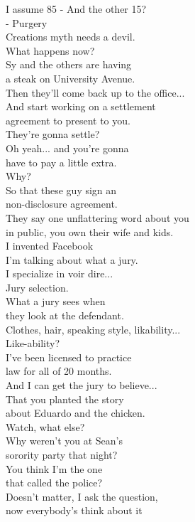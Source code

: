 \documentclass{article}
\begin{document}
\begin{multicols}{3}
I assume 85%
- And the other 15?\\
- Purgery\\
Creations myth needs a devil.\\
What happens now?\\
Sy and the others are having\\
a steak on University Avenue.\\
Then they'll come back up to the office...\\
And start working on a settlement\\
agreement to present to you.\\
They're gonna settle?\\
Oh yeah... and you're gonna\\
have to pay a little extra.\\
Why?\\
So that these guy sign an\\
non-disclosure agreement.\\
They say one unflattering word about you\\
in public, you own their wife and kids.\\
I invented Facebook\\
I'm talking about what a jury.\\
I specialize in voir dire...\\
Jury selection.\\
What a jury sees when\\
they look at the defendant.\\
Clothes, hair, speaking style, likability...\\
Like-ability?\\
I've been licensed to practice\\
law for all of 20 months.\\
And I can get the jury to believe...\\
That you planted the story\\
about Eduardo and the chicken.\\
Watch, what else?\\
Why weren't you at Sean's\\
sorority party that night?\\
You think I'm the one\\
that called the police?\\
Doesn't matter, I ask the question,\\
now everybody's think about it\\

\end{multicols}
\end{document}
